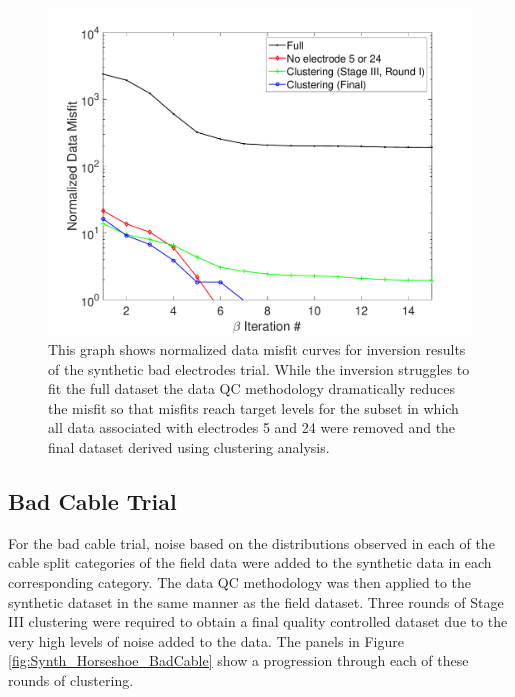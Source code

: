 \documentclass[final,authoryear,5p,times,twocolumn]{elsarticle}
\begin{document}
\begin{figure} [!ht]
	\begin{center}
	\includegraphics[trim=1.3cm 0.2cm 2.6cm 1.2cm, clip=true,width=0.75\linewidth]{./Figures/Fig22.pdf}
	\end{center}
\caption{This graph shows normalized data misfit curves for inversion results of the synthetic bad electrodes trial. While the inversion struggles to fit the full dataset the data QC methodology dramatically reduces the misfit so that misfits reach target levels for the subset in which all data associated with electrodes 5 and 24 were removed and the final dataset derived using clustering analysis.}
\label{fig:Synth_Horseshoe_BadElec_MisfitPlots}
\end{figure}

\subsection{Bad Cable Trial}

For the bad cable trial, noise based on the distributions observed in each of the cable split categories of the field data were added to the synthetic data in each corresponding category. The data QC methodology was then applied to the synthetic dataset in the same manner as the field dataset. Three rounds of Stage III clustering were required to obtain a final quality controlled dataset due to the very high levels of noise added to the data. The panels in Figure \ref{fig:Synth_Horseshoe_BadCable} show a progression through each of these rounds of clustering.
\end{document}
